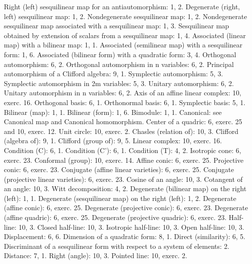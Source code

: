 Right (left) sesquilinear map for an antiautomorphism: 1, 2. Degenerate (right, left) sesquilinear map: 1, 2. Nondegenerate sesquilinear map: 1, 2. Nondegenerate sesquilinear map associated with a sesquilinear map: 1, 3. Sesquilinear map obtained by extension of scalars from a sesquilinear map: 1, 4. Associated (linear map) with a bilinear map: 1, 1. Associated (semilinear map) with a sesquilinear form: 1, 6. Associated (bilinear form) with a quadratic form: 3, 4. Orthogonal automorphism: 6, 2. Orthogonal automorphism in n variables: 6, 2. Principal automorphism of a Clifford algebra: 9, 1. Symplectic automorphism: 5, 3. Symplectic automorphism in 2m variables: 5, 3. Unitary automorphism: 6, 2. Unitary automorphism in n variables: 6, 2. Axis of an affine linear complex: 10, exerc. 16. Orthogonal basis: 6, 1. Orthonormal basis: 6, 1. Symplectic basis: 5, 1. Bilinear (map): 1, 1. Bilinear (form): 1, 6. Bimodule: 1, 1. Canonical: see Canonical map and Canonical homomorphism. Center of a quadric: 6, exerc. 25 and 10, exerc. 12. Unit circle: 10, exerc. 2. Chasles (relation of): 10, 3. Clifford (algebra of): 9, 1. Clifford (group of): 9, 5. Linear complex: 10, exerc. 16. Condition (C): 6, 1. Condition (C'): 6, 1. Condition (T): 4, 2. Isotropic cone: 6, exerc. 23. Conformal (group): 10, exerc. 14. Affine conic: 6, exerc. 25. Projective conic: 6, exerc. 23. Conjugate (affine linear varieties): 6, exerc. 25. Conjugate (projective linear varieties): 6, exerc. 23. Cosine of an angle: 10, 3. Cotangent of an angle: 10, 3. Witt decomposition: 4, 2. Degenerate (bilinear map) on the right (left): 1, 1. Degenerate (sesquilinear map) on the right (left): 1, 2. Degenerate (affine conic): 6, exerc. 25. Degenerate (projective conic): 6, exerc. 23. Degenerate (affine quadric): 6, exerc. 25. Degenerate (projective quadric): 6, exerc. 23. Half-line: 10, 3. Closed half-line: 10, 3. Isotropic half-line: 10, 3. Open half-line: 10, 3. Displacement: 6, 6. Dimension of a quadratic form: 8, 1. Direct (similarity): 6, 5. Discriminant of a sesquilinear form with respect to a system of elements: 2. Distance: 7, 1. Right (angle): 10, 3. Pointed line: 10, exerc. 2.


